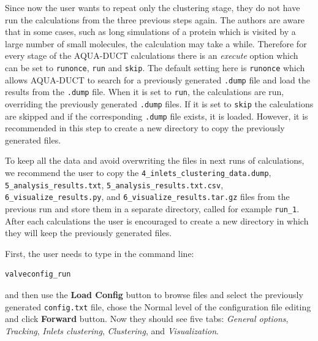\documentclass[9pt,tutorial]{livecoms}
\begin{document}
Since now the user wants to repeat only the clustering stage, they do not have run the calculations from the three previous steps again. The authors are aware that in some cases, such as long simulations of a protein which is visited by a large number of small molecules, the calculation may take a while. Therefore for every stage of the AQUA-DUCT calculations there is an \textit{execute} option which can be set to \texttt{runonce}, \texttt{run} and \texttt{skip}. The default setting here is \texttt{runonce} which allows AQUA-DUCT to search for a previously generated \texttt{.dump} file and load the results from the \texttt{.dump} file. When it is set to \texttt{run}, the calculations are run, overriding the previously generated \texttt{.dump} files. If it is set to \texttt{skip} the calculations are skipped and if the corresponding \texttt{.dump} file exists, it is loaded. However, it is recommended in this step to create a new directory to copy the previously generated files.

To keep all the data and avoid overwriting the files in next runs of calculations, we recommend the user to copy the \texttt{4\_inlets\_clustering\_data.dump}, \texttt{5\_analysis\_results.txt}, \texttt{5\_analysis\_results.txt.csv}, \texttt{6\_visualize\_results.py}, and \texttt{6\_visualize\_results.tar.gz} files from the previous run and store them in a separate directory, called for example \texttt{run\_1}. After each calculations the user is encouraged to create a new directory in which they will keep the previously generated files.

First, the user needs to type in the command line:
\begin{lstlisting}
valveconfig_run
\end{lstlisting}
and then use the \textbf{Load Config} button to browse files and select the previously generated \texttt{config.txt} file, chose the Normal level of the configuration file editing and click \textbf{Forward} button. Now they should see five tabs: \textit{General options}, \textit{Tracking}, \textit{Inlets clustering}, \textit{Clustering}, and \textit{Visualization}.
\end{document}
